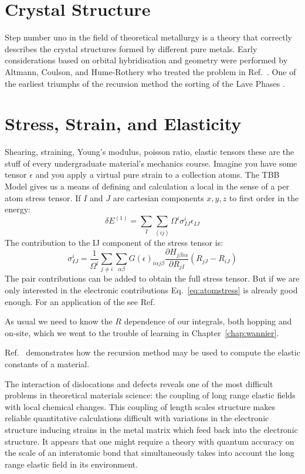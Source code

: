 \section{Crystal Structure}
Step number uno in the field of theoretical metallurgy is a theory that correctly
describes the crystal structures formed by different pure metals. 
Early considerations based on orbital hybridisation and geometry
were performed by Altmann, Coulson, and Hume-Rothery who treated 
the problem in Ref.~\cite{altmann57}. One of the earliest triumphs 
of the recursion method the sorting of the Lave 
Phases \cite{haydocklaves75,johannes76}.

\section{Stress, Strain, and Elasticity}
Shearing, straining, Young's modulus, poisson ratio, elastic tensors these are the
stuff of every undergraduate material's mechanics course.
Imagine you have some tensor $\epsilon$ and you apply a virtual pure strain to a collection atoms.
The TBB Model \cite{nielsen83, sutton88} gives us a means of defining and calculation 
a local in the sense of a per atom stress tensor. If $I$ and $J$ 
are cartesian components $x,y,z$ to first order in the energy:
%
\begin{equation}
\delta E^(1) = \sum_{I} \sum_{(ij)}\Omega^{i}\sigma^{i}_{IJ}\epsilon_{IJ}
\end{equation}
%
The contribution to the IJ component of the stress tensor is:
%
\begin{equation}
\label{eq:atomstress}
\sigma^{i}_{IJ} = \frac{1}{\Omega^{i}}\sum_{j\neq i}\sum_{\alpha\beta}G(\epsilon)_{i\alpha j\beta}\frac{\partial H_{j\beta i\alpha}}{\partial R_{jI}}(R_{jJ}-R_{iJ})
\end{equation}
%
The pair contributions can be added to obtain the full stress tensor. 
But if we are only interested in the electronic contributions
Eq.~\ref{eq:atomstress} is already good enough. For an application of the 
see Ref.~\cite{ohta90}

As usual we need to know the $R$ dependence of our
integrals, both hopping and on-site, which we went to the trouble 
of learning in Chapter~\ref{chap:wannier}.

Ref.~\cite{terakura84} demonstrates how the recursion method
may be used to compute the elastic constants of a material.

The interaction of dislocations and defects reveals one of the most difficult problems
in theoretical materials science: the coupling of long range elastic fields
with local chemical changes. This coupling of length scales structure makes
reliable quantitative calculations difficult with variations in the electronic structure
inducing strains in the metal matrix which feed back into the electronic structure. 
It appears that one might require a theory with quantum accuracy on the scale of an 
interatomic bond that simultaneously takes into account the long range elastic 
field in its environment.

